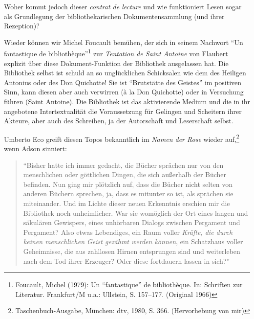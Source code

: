 Woher kommt jedoch dieser \emph{contrat de lecture} und wie funktioniert
Lesen sogar als Grundlegung der bibliothekarischen Dokumentensammlung
(und ihrer Rezeption)?

Wieder können wir Michel Foucault bemühen, der sich in seinem Nachwort
\enquote{Un fantastique de bibliothèque}\footnote{Foucault, Michel
  (1979): Un \enquote{fantastique} de bibliothèque. In: Schriften zur
  Literatur. Frankfurt/M u.a.: Ullstein, S. 157--177. (Original 1966)}
zur \emph{Tentation de Saint Antoine} von Flaubert explizit über diese
Dokument-Funktion der Bibliothek ausgelassen hat. Die Bibliothek selbst
ist schuld an so unglücklichen Schicksalen wie dem des Heiligen Antonius
oder des Don Quichotte! Sie ist \enquote{Brutstätte des Geistes} im
positiven Sinn, kann diesen aber auch verwirren (à la Don Quichotte)
oder in Versuchung führen (Saint Antoine). Die Bibliothek ist das
aktivierende Medium und die in ihr angebotene Intertextualität die
Voraussetzung für Gelingen und Scheitern ihrer Akteure, aber auch des
Schreiben, ja der Autorschaft und Leserschaft selbst.

Umberto Eco greift diesen Topos bekanntlich im \emph{Namen der Rose}
wieder auf,\footnote{Taschenbuch-Ausgabe, München: dtv, 1980, S. 366.
  (Hervorhebung von mir)} wenn Adson sinniert:
\begin{flushleft}
\begin{quote}
\enquote{Bisher hatte ich immer gedacht, die Bücher sprächen nur von den
menschlichen oder göttlichen Dingen, die sich außerhalb der Bücher
befinden. Nun ging mir plötzlich auf, dass die Bücher nicht selten von
anderen Büchern sprechen, ja, dass es mitunter so ist, als sprächen sie
miteinander. Und im Lichte dieser neuen Erkenntnis erschien mir die
Bibliothek noch unheimlicher. War sie womöglich der Ort eines langen und
säkulären Gewispers, eines unhörbaren Dialogs zwischen Pergament und
Pergament? Also etwas Lebendiges, ein Raum voller \emph{Kräfte, die
durch keinen menschlichen Geist gezähmt werden können}, ein Schatzhaus
voller Geheimnisse, die aus zahllosen Hirnen entsprungen sind und
weiterleben nach dem Tod ihrer Erzeuger? Oder diese fortdauern lassen in
sich?}
\end{quote}
\end{flushleft}


